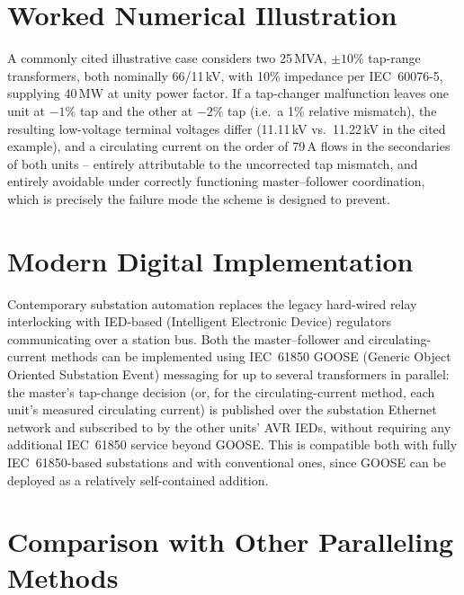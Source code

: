 \documentclass[11pt,a4paper]{article}
\begin{document}
\section{Worked Numerical Illustration}

A commonly cited illustrative case considers two 25\,MVA, $\pm 10\%$ tap-range transformers, both nominally 66/11\,kV, with 10\% impedance per IEC~60076-5, supplying 40\,MW at unity power factor. If a tap-changer malfunction leaves one unit at $-1\%$ tap and the other at $-2\%$ tap (i.e.\ a 1\% relative mismatch), the resulting low-voltage terminal voltages differ (11.11\,kV vs.\ 11.22\,kV in the cited example), and a circulating current on the order of 79\,A flows in the secondaries of both units -- entirely attributable to the uncorrected tap mismatch, and entirely avoidable under correctly functioning master--follower coordination, which is precisely the failure mode the scheme is designed to prevent.

\section{Modern Digital Implementation}

Contemporary substation automation replaces the legacy hard-wired relay interlocking with IED-based (Intelligent Electronic Device) regulators communicating over a station bus. Both the master--follower and circulating-current methods can be implemented using IEC~61850 GOOSE (Generic Object Oriented Substation Event) messaging for up to several transformers in parallel: the master's tap-change decision (or, for the circulating-current method, each unit's measured circulating current) is published over the substation Ethernet network and subscribed to by the other units' AVR IEDs, without requiring any additional IEC~61850 service beyond GOOSE. This is compatible both with fully IEC~61850-based substations and with conventional ones, since GOOSE can be deployed as a relatively self-contained addition.

\section{Comparison with Other Paralleling Methods}
\end{document}
